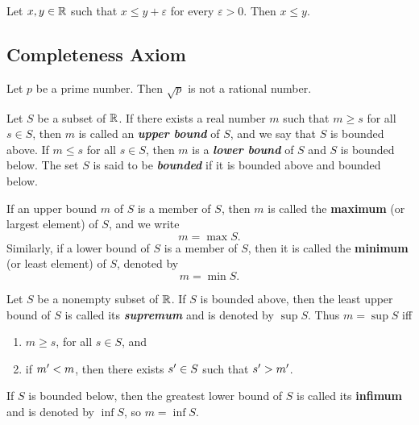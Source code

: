 \documentclass[12pt]{article}
\begin{document}
\begin{theorem}
  Let $x, y \in \mathbb{R}$ such that $x \le y + \varepsilon$ for every $\varepsilon > 0$. Then $x \le y$.
\end{theorem}

\subsection{Completeness Axiom}
\label{sec:org3c0f923}
\begin{definition}[Irrational]
  Let $p$ be a prime number. Then $\sqrt{p}$ is not a rational number.
\end{definition}

\begin{definition}[Bounds]
  Let $S$ be a subset of $\mathbb{R}$. If  there exists a real number $m$ such that
  $m \ge s$ for all $s \in S$, then $m$ is called an \textit{\textbf{upper bound}}
  of $S$, and  we say that $S$ is bounded  above. If $m \le s$ for  all $s \in S$,
  then $m$ is a \textit{\textbf{lower bound}} of $S$ and $S$ is bounded below.
  The set $S$  is said to be \textit{\textbf{bounded}} if  it is bounded above
  and bounded below.
\end{definition}

\begin{definition}
  If an  upper bound $m$  of $S$ is  a member of $S$,  then $m$ is  called the
  \textbf{maximum} (or largest  element) of $S$, and we write  $$m = \max S.$$
  Similarly, if a lower bound of $S$ is a member of $S$, then it is called the
  \textbf{minimum} (or least element) of $S$, denoted by $$m = \min S.$$
\end{definition}

\begin{definition}
  Let $S$ be a  nonempty subset of $\mathbb{R}$. If $S$ is  bounded above, then the
  least upper  bound of  $S$ is called  its \textit{\textbf{supremum}}  and is
  denoted by $\sup S$. Thus $m = \sup S$ iff

  \begin{enumerate}
    \item $m \ge s$, for all $s \in S$, and 
    \item if $m' < m$, then there exists $s' \in S$ such that $s' > m'$.
  \end{enumerate}

  If $S$ is bounded below, then the  greatest lower bound of $S$ is called its
  \textbf{infimum} and is denoted by $\inf S$, so $m = \inf S$.

\end{definition}
\end{document}
